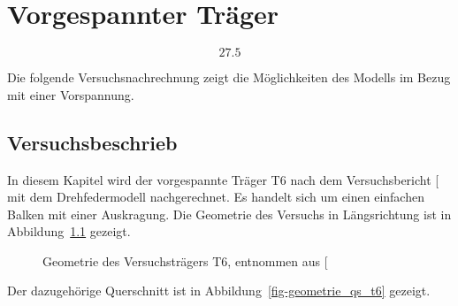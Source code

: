 \documentclass[
  11pt,
  letterpaper,
]{scrreprt}
\begin{document}

\chapter{Vorgespannter Träger}\label{vorgespannter-truxe4ger}

\begin{equation*}27.5\end{equation*}

Die folgende Versuchsnachrechnung zeigt die Möglichkeiten des Modells im
Bezug mit einer Vorspannung.

\section{Versuchsbeschrieb}\label{versuchsbeschrieb}

In diesem Kapitel wird der vorgespannte Träger T6 nach dem
Versuchsbericht {[}\citeproc{ref-sigrist_versuche_1993}{5}{]} mit dem
Drehfedermodell nachgerechnet. Es handelt sich um einen einfachen Balken
mit einer Auskragung. Die Geometrie des Versuchs in Längsrichtung ist in
Abbildung~\ref{fig-geometrie_t6} gezeigt.

\begin{figure}[H]


\caption{\label{fig-geometrie_t6}Geometrie des Versuchsträgers T6,
entnommen aus {[}\citeproc{ref-sigrist_versuche_1993}{5}{]}}

\end{figure}%

Der dazugehörige Querschnitt ist in Abbildung~\ref{fig-geometrie_qs_t6}
gezeigt.
\end{document}
